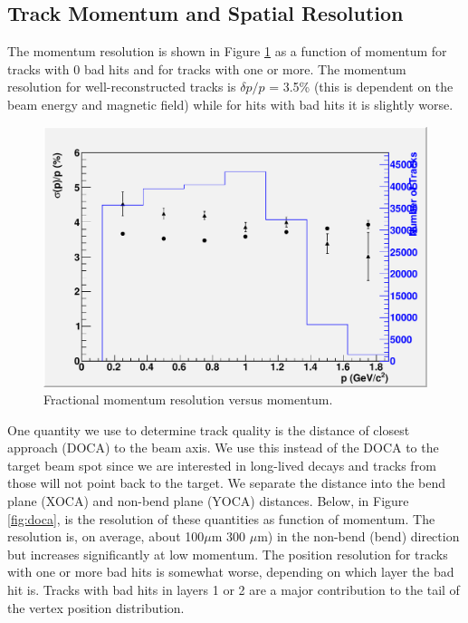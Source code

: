 \subsection{Track Momentum and Spatial Resolution}

The momentum resolution is shown in Figure \ref{fig:trkmom} as a function of momentum for tracks with 
0 bad hits and for tracks with one or more.  The momentum resolution for well-reconstructed 
tracks is $\delta p/p$ = 3.5\% (this is dependent on the beam energy and magnetic field) while for hits with bad hits it is slightly worse. 


\begin{figure}
\includegraphics[scale=0.8]{performance/tracking_performance/momResvsMom.pdf}
\caption{  Fractional momentum resolution versus momentum. } 
\label{fig:trkmom}
\end{figure}


One quantity we use to determine track quality is the distance of closest approach (DOCA) 
to the beam axis.  We use this instead of the DOCA to the target beam spot since we are 
interested in long-lived decays and tracks from those will not point back to the target. 
We separate the distance into the bend plane (XOCA) and non-bend plane (YOCA) distances.  
Below, in Figure \ref{fig:doca}, is the resolution of these quantities as function of momentum.  
The resolution is, on average, about 100$\mu$m 300 $\mu$m) 
in the non-bend (bend) direction but increases significantly at low momentum.  The position 
resolution for tracks with one or more bad hits is somewhat worse, depending on which layer 
the bad hit is.  Tracks with bad hits in 
layers 1 or 2 are a major contribution to the tail of the vertex position distribution. 
    
